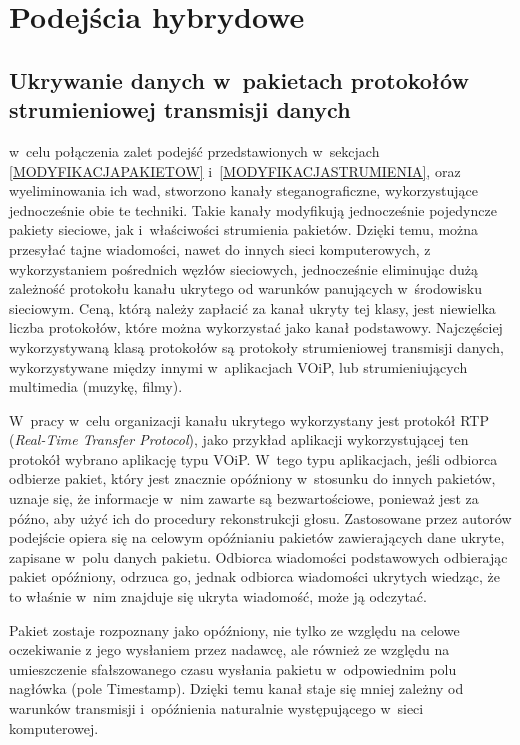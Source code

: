 \documentclass[a4paper, twoside, 12pt]{report}
\begin{document}
    \section{Podejścia hybrydowe}
        \subsection{Ukrywanie danych w~pakietach protokołów strumieniowej transmisji danych}
        w~celu połączenia zalet podejść przedstawionych w~sekcjach
        \ref{MODYFIKACJAPAKIETOW} i~\ref{MODYFIKACJASTRUMIENIA}, oraz wyeliminowania
        ich wad, stworzono kanały steganograficzne, wykorzystujące jednocześnie obie te
        techniki. Takie kanały modyfikują jednocześnie pojedyncze pakiety sieciowe,
        jak i~właściwości strumienia pakietów. Dzięki temu, można przesyłać tajne wiadomości,
        nawet do innych sieci komputerowych, z wykorzystaniem pośrednich węzłów sieciowych,
        jednocześnie eliminując dużą zależność protokołu kanału ukrytego od warunków
        panujących w~środowisku sieciowym. Ceną, którą należy zapłacić za kanał
        ukryty tej klasy, jest niewielka liczba protokołów, które można wykorzystać
        jako kanał podstawowy. Najczęściej wykorzystywaną klasą protokołów są
        protokoły strumieniowej transmisji danych, wykorzystywane między innymi
        w~aplikacjach VOiP, lub strumieniujących multimedia (muzykę, filmy).

        W~pracy \cite{VOIPSTEGANOGRAPHY} w~celu organizacji kanału ukrytego wykorzystany
        jest protokół RTP (\emph{Real-Time Transfer Protocol}), jako przykład aplikacji
        wykorzystującej ten protokół wybrano aplikację typu VOiP. W~tego typu aplikacjach,
        jeśli odbiorca odbierze pakiet, który jest znacznie opóźniony w~stosunku
        do innych pakietów, uznaje się, że informacje w~nim zawarte są bezwartościowe,
        ponieważ jest za późno, aby użyć ich do procedury rekonstrukcji głosu.
        Zastosowane przez autorów podejście opiera się na celowym opóźnianiu pakietów
        zawierających dane ukryte, zapisane w~polu danych pakietu.
        Odbiorca wiadomości podstawowych odbierając pakiet
        opóźniony, odrzuca go, jednak odbiorca wiadomości ukrytych wiedząc, że to właśnie
        w~nim znajduje się ukryta wiadomość, może ją odczytać.

        Pakiet zostaje rozpoznany jako opóźniony, nie tylko ze względu na celowe
        oczekiwanie z jego wysłaniem przez nadawcę, ale również ze względu
        na umieszczenie sfałszowanego czasu wysłania pakietu w~odpowiednim
        polu nagłówka (pole Timestamp). Dzięki temu kanał staje się mniej zależny
        od warunków transmisji i~opóźnienia naturalnie występującego w~sieci komputerowej.
\end{document}
